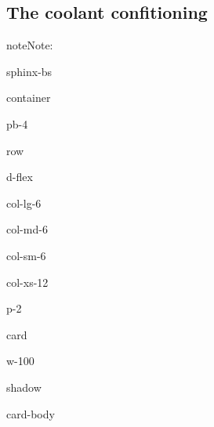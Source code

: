 \documentclass[letterpaper,10pt,english]{jupyterBook}
\begin{document}
\subsection{The coolant confitioning}
\label{\detokenize{06_Starting_An_instance:the-coolant-confitioning}}
\begin{sphinxadmonition}{note}{Note:}
\sphinxAtStartPar
{}

\begin{sphinxuseclass}{sphinx-bs}
\begin{sphinxuseclass}{container}
\begin{sphinxuseclass}{pb-4}
\begin{sphinxuseclass}{row}
\begin{sphinxuseclass}{d-flex}
\begin{sphinxuseclass}{col-lg-6}
\begin{sphinxuseclass}{col-md-6}
\begin{sphinxuseclass}{col-sm-6}
\begin{sphinxuseclass}{col-xs-12}
\begin{sphinxuseclass}{p-2}
\begin{sphinxuseclass}{card}
\begin{sphinxuseclass}{w-100}
\begin{sphinxuseclass}{shadow}
\begin{sphinxuseclass}{card-body}
\sphinxAtStartPar
{}


\end{sphinxuseclass}
\end{sphinxuseclass}
\end{sphinxuseclass}
\end{sphinxuseclass}
\end{sphinxuseclass}
\end{sphinxuseclass}
\end{sphinxuseclass}
\end{sphinxuseclass}
\end{sphinxuseclass}
\end{sphinxuseclass}
\end{sphinxuseclass}
\end{sphinxuseclass}
\end{sphinxuseclass}
\end{sphinxuseclass}
\end{sphinxadmonition}
\end{document}
